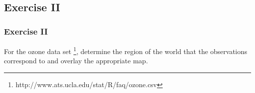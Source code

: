 \subsection{Exercise II}
\begin{frame}
	\frametitle{Exercise II}
	For the \ttfamily ozone \normalfont data set \footnote{\ttfamily http://www.ats.ucla.edu/stat/R/faq/ozone.csv\normalfont}, determine the region of the world that the observations correspond to and overlay the appropriate map.
\end{frame}
